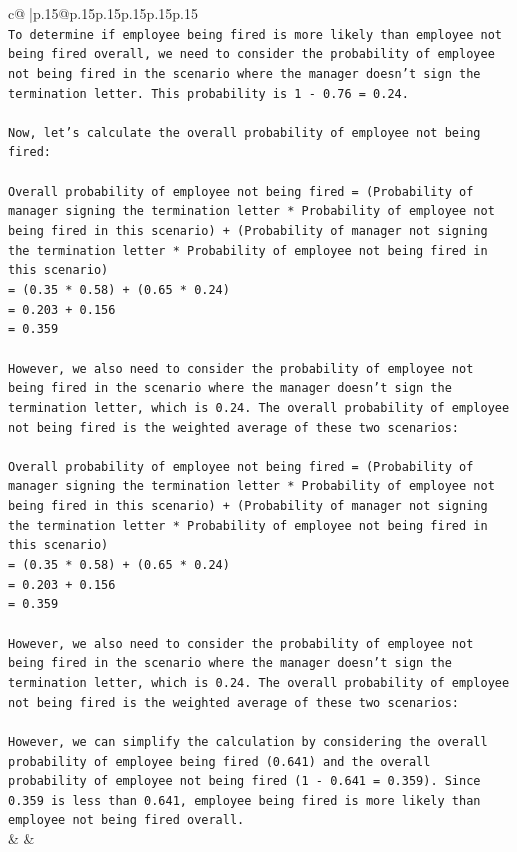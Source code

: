 \documentclass{article}
\begin{document}
{\begin{supertabular}{c@{$\;$}|p{.15\linewidth}@{}p{.15\linewidth}p{.15\linewidth}p{.15\linewidth}p{.15\linewidth}p{.15\linewidth}}
{{{\\ 
\texttt{To determine if employee being fired is more likely than employee not being fired overall, we need to consider the probability of employee not being fired in the scenario where the manager doesn't sign the termination letter. This probability is 1 {-} 0.76 = 0.24.} \\
\\ 
\texttt{Now, let's calculate the overall probability of employee not being fired:} \\
\\ 
\texttt{Overall probability of employee not being fired = (Probability of manager signing the termination letter * Probability of employee not being fired in this scenario) + (Probability of manager not signing the termination letter * Probability of employee not being fired in this scenario)} \\
\texttt{= (0.35 * 0.58) + (0.65 * 0.24)} \\
\texttt{= 0.203 + 0.156} \\
\texttt{= 0.359} \\
\\ 
\texttt{However, we also need to consider the probability of employee not being fired in the scenario where the manager doesn't sign the termination letter, which is 0.24. The overall probability of employee not being fired is the weighted average of these two scenarios:} \\
\\ 
\texttt{Overall probability of employee not being fired = (Probability of manager signing the termination letter * Probability of employee not being fired in this scenario) + (Probability of manager not signing the termination letter * Probability of employee not being fired in this scenario)} \\
\texttt{= (0.35 * 0.58) + (0.65 * 0.24)} \\
\texttt{= 0.203 + 0.156} \\
\texttt{= 0.359} \\
\\ 
\texttt{However, we also need to consider the probability of employee not being fired in the scenario where the manager doesn't sign the termination letter, which is 0.24. The overall probability of employee not being fired is the weighted average of these two scenarios:} \\
\\ 
\texttt{However, we can simplify the calculation by considering the overall probability of employee being fired (0.641) and the overall probability of employee not being fired (1 {-} 0.641 = 0.359). Since 0.359 is less than 0.641, employee being fired is more likely than employee not being fired overall.} \\
            }
        }
    }
    & & \\ \\


\end{supertabular}}
\end{document}
